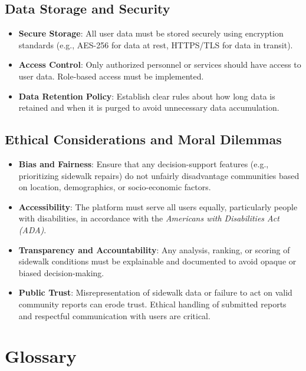 \documentclass[a4paper,12pt]{article}
\begin{document}
\subsection{Data Storage and Security}
\begin{itemize}
    \item \textbf{Secure Storage}: All user data must be stored securely using encryption standards (e.g., AES-256 for data at rest, HTTPS/TLS for data in transit).
    \item \textbf{Access Control}: Only authorized personnel or services should have access to user data. Role-based access must be implemented.
    \item \textbf{Data Retention Policy}: Establish clear rules about how long data is retained and when it is purged to avoid unnecessary data accumulation.
\end{itemize}

\subsection{Ethical Considerations and Moral Dilemmas}
\begin{itemize}
    \item \textbf{Bias and Fairness}: Ensure that any decision-support features (e.g., prioritizing sidewalk repairs) do not unfairly disadvantage communities based on location, demographics, or socio-economic factors.
    \item \textbf{Accessibility}: The platform must serve all users equally, particularly people with disabilities, in accordance with the \textit{Americans with Disabilities Act (ADA)}.
    \item \textbf{Transparency and Accountability}: Any analysis, ranking, or scoring of sidewalk conditions must be explainable and documented to avoid opaque or biased decision-making.
    \item \textbf{Public Trust}: Misrepresentation of sidewalk data or failure to act on valid community reports can erode trust. Ethical handling of submitted reports and respectful communication with users are critical.
\end{itemize}

\newpage
\section{Glossary}
\end{document}
